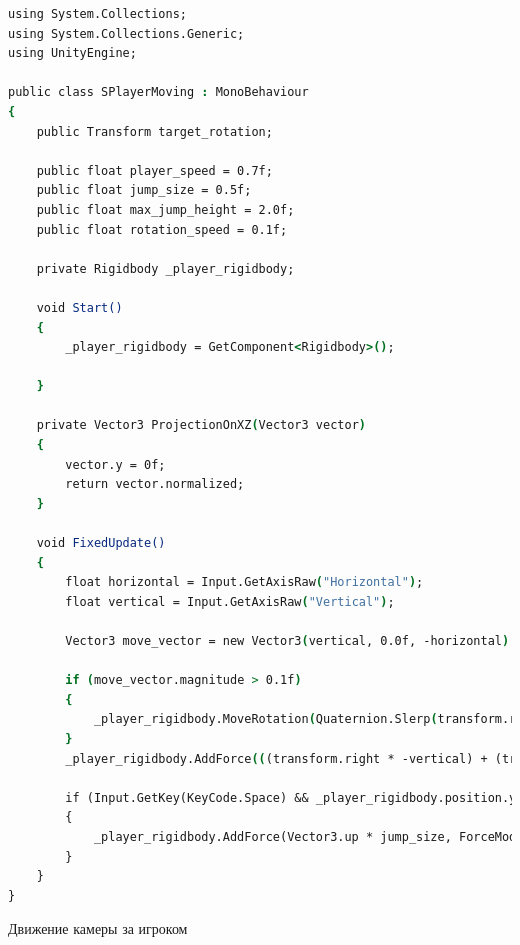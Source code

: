 \begin{lstlisting}[language=csh]
using System.Collections;
using System.Collections.Generic;
using UnityEngine;

public class SPlayerMoving : MonoBehaviour
{
    public Transform target_rotation;

    public float player_speed = 0.7f;
    public float jump_size = 0.5f;
    public float max_jump_height = 2.0f;
    public float rotation_speed = 0.1f;

    private Rigidbody _player_rigidbody;

    void Start()
    {
        _player_rigidbody = GetComponent<Rigidbody>();

    }

    private Vector3 ProjectionOnXZ(Vector3 vector)
    {
        vector.y = 0f;
        return vector.normalized;
    }

    void FixedUpdate()
    {
        float horizontal = Input.GetAxisRaw("Horizontal");
        float vertical = Input.GetAxisRaw("Vertical");

        Vector3 move_vector = new Vector3(vertical, 0.0f, -horizontal).normalized;

        if (move_vector.magnitude > 0.1f)
        {
            _player_rigidbody.MoveRotation(Quaternion.Slerp(transform.rotation, Quaternion.LookRotation(ProjectionOnXZ(target_rotation.right)), rotation_speed));
        }
        _player_rigidbody.AddForce(((transform.right * -vertical) + (transform.forward * (horizontal))) * player_speed, ForceMode.VelocityChange);

        if (Input.GetKey(KeyCode.Space) && _player_rigidbody.position.y < max_jump_height)
        {
            _player_rigidbody.AddForce(Vector3.up * jump_size, ForceMode.VelocityChange);
        }
    }
}
\end{lstlisting}

  Движение камеры за игроком

